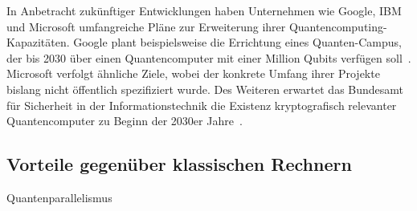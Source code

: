 In Anbetracht zukünftiger Entwicklungen haben Unternehmen wie Google, IBM und Microsoft umfangreiche Pläne zur Erweiterung ihrer Quantencomputing-Kapazitäten. 
Google plant beispielsweise die Errichtung eines Quanten-Campus, der bis 2030 über einen Quantencomputer mit einer Million Qubits verfügen soll~\cite{Google_2023}. 
Microsoft verfolgt ähnliche Ziele, wobei der konkrete Umfang ihrer Projekte bislang nicht öffentlich spezifiziert wurde.
Des Weiteren erwartet das Bundesamt für Sicherheit in der Informationstechnik die Existenz kryptografisch relevanter Quantencomputer zu Beginn der 2030er Jahre~\cite{BSI_KPMG_2023}. 

\subsection{Vorteile gegenüber klassischen Rechnern} 
Quantenparallelismus 
